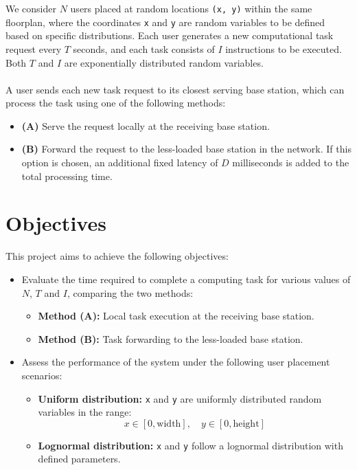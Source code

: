\documentclass{report}
\begin{document}
We consider $N$ users placed at random locations \texttt{(x, y)} within the same floorplan, where the coordinates \texttt{x} and \texttt{y} are random variables to be defined based on specific distributions.
Each user generates a new computational task request every $T$ seconds, and each task consists of $I$ instructions to be executed. Both $T$ and $I$ are exponentially distributed random variables.\\\\
A user sends each new task request to its closest serving base station, which can process the task using one of the following methods:
\begin{itemize}
    \item \textbf{(A)} Serve the request locally at the receiving base station.
    \item \textbf{(B)} Forward the request to the less-loaded base station in the network. If this option is chosen, an additional fixed latency of $D$ milliseconds is added to the total processing time.
\end{itemize}

\section{Objectives}

This project aims to achieve the following objectives:
\begin{itemize}
    \item Evaluate the time required to complete a computing task for various values of $N$, $T$ and $I$, comparing the two methods:
    \begin{itemize}
        \item \textbf{Method (A):} Local task execution at the receiving base station.
        \item \textbf{Method (B):} Task forwarding to the less-loaded base station.
    \end{itemize}
    \item Assess the performance of the system under the following user placement scenarios:
    \begin{itemize}
        \item \textbf{Uniform distribution:} \texttt{x} and \texttt{y} are uniformly distributed random variables in the range:
        \[
        x \in [0, \text{width}], \quad y \in [0, \text{height}]
        \]
        \item \textbf{Lognormal distribution:} \texttt{x} and \texttt{y} follow a lognormal distribution with defined parameters.
    \end{itemize}
\end{itemize}
\end{document}
